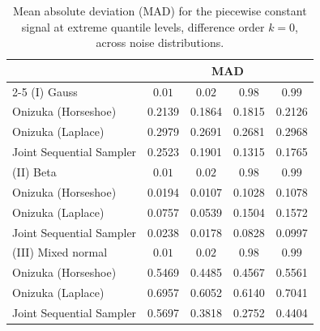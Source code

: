 \begin{table}[htbp]
\centering
\caption{Mean absolute deviation (MAD) for the piecewise constant signal at extreme quantile levels, difference order $k = 0$, across noise distributions.}
\label{tab:pc_ext_mad}
\begin{tabular}{lcccc}
\toprule
& \multicolumn{4}{c}{MAD} \\
\cmidrule(lr){2-5}
(I) Gauss & $0.01$ & $0.02$ & $0.98$ & $0.99$ \\
\midrule
Onizuka (Horseshoe)      & 0.2139 & 0.1864 & 0.1815 & 0.2126 \\
Onizuka (Laplace)        & 0.2979 & 0.2691 & 0.2681 & 0.2968 \\
Joint Sequential Sampler & 0.2523 & 0.1901 & 0.1315 & 0.1765 \\
\midrule
(II) Beta & $0.01$ & $0.02$ & $0.98$ & $0.99$ \\
\midrule
Onizuka (Horseshoe)      & 0.0194 & 0.0107 & 0.1028 & 0.1078 \\
Onizuka (Laplace)        & 0.0757 & 0.0539 & 0.1504 & 0.1572 \\
Joint Sequential Sampler & 0.0238 & 0.0178 & 0.0828 & 0.0997 \\
\midrule
(III) Mixed normal & $0.01$ & $0.02$ & $0.98$ & $0.99$ \\
\midrule
Onizuka (Horseshoe)      & 0.5469 & 0.4485 & 0.4567 & 0.5561 \\
Onizuka (Laplace)        & 0.6957 & 0.6052 & 0.6140 & 0.7041 \\
Joint Sequential Sampler & 0.5697 & 0.3818 & 0.2752 & 0.4404 \\
\bottomrule
\end{tabular}
\end{table}

